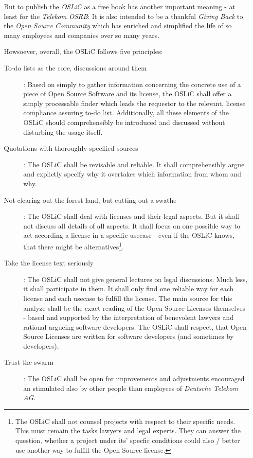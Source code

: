 But to publish the \emph{OSLiC} as a free book has another important meaning -
at least for the \emph{Telekom OSRB}: It is also intended to be a thankful
\emph{Giving Back} to the \emph{Open Source Community} which has enriched and
simplified the life of so many employees and companies over so many years.

Howsoever, overall, the OSLiC follows five principles:

\begin{description}
  \item[To-do lists as the core, discussions around them]: Based on simply to
  gather information concerning the concrete use of a piece of Open Source
  Software and its license, the OSLiC shall offer a simply processable finder
  which leads the requestor to the relevant, license compliance assuring to-do
  list. Additionally, all these elements of the OSLiC should comprehensibly
  be introduced and discussed without disturbing the usage itself.

  \item[Quotations with thoroughly specified sources]: The OSLiC shall be
  revisable and reliable. It shall comprehensibly argue and explictly specify
  why it overtakes which information from whom and why.

 \item[Not clearing out the forest land, but cutting out a swathe]: The OSLiC
  shall deal with licenses and their legal aspects. But it shall not discuss all
  details of all aspects. It shall focus on one possible way to act according a
  license in a specific usecase - even if the OSLiC knows, that there might be
  alternatives\footnote{The OSLiC shall not counsel projects with respect to
  their specific needs. This must remain the tasks lawyers and legal experts.
  They can answer the question, whether a project under its' specfic conditions
  could also / better use another way to fulfill the Open Source license.}.
  
  \item[Take the license text seriously]: The OSLiC shall not give general
  lectures on legal discussions. Much less, it shall participate in them. It
  shall only find one reliable way for each license and each usecase to fulfill
  the license. The main source for this analyze shall be the exact reading of
  the Open Source Licenses themselves - based and supported by the
  interpretation of benevolent lawyers and rational argueing software
  developers. The OSLiC shall respect, that Open Source Licenses are written for
  software developers (and sometimes by developers).
  
  \item[Trust the swarm]: The OSLiC shall be open for improvements and
  adjustments encouraged an stimulated also by other people than employees of
  \emph{Deutsche Telekom AG}.
\end{description}

